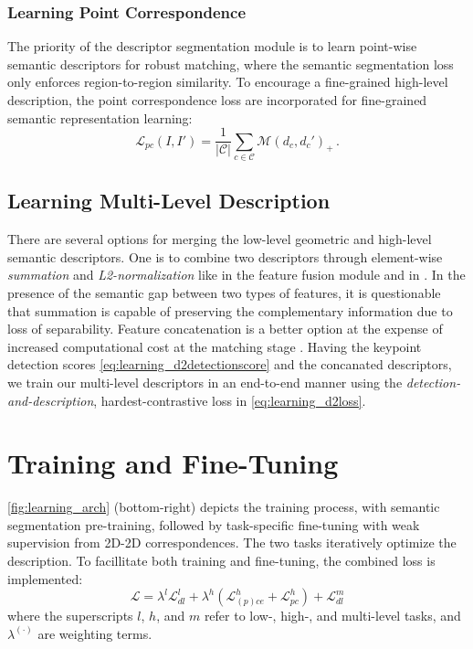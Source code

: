 \subsubsection{Learning Point Correspondence}
The priority of the descriptor segmentation module is to learn point-wise semantic descriptors for robust matching, where the semantic segmentation loss only enforces region-to-region similarity. To encourage a fine-grained high-level description, the point correspondence loss are incorporated for fine-grained semantic representation learning:
\begin{equation} \label{eq:learning_pc}
\mathcal{L}_{pc}(I,I') = \frac{1}{|\mathcal{C}|} \sum_{c \in
\mathcal{C}} \mathcal{M}(d_c,d_c')_+ \,.
\end{equation}

\subsection{Learning Multi-Level Description}
There are several options for merging the low-level geometric and high-level semantic descriptors. 
One is to combine two descriptors through element-wise \textit{summation} and \textit{L2-normalization} like in the feature
fusion module and in \cite{luo2019contextdesc}.
In the presence of the semantic gap between two types of features, it is questionable that summation is capable of preserving the complementary information due to loss of separability.
Feature concatenation is a better option at the expense of increased computational cost at the matching stage
\cite{hariharan2015hypercolumns, fathy2018hierarchical,
spencer2019scale, germain2019sparse, min2019hyperpixel}. 
Having the keypoint detection scores \eqref{eq:learning_d2detectionscore} and the concanated descriptors, we train our multi-level descriptors in an
end-to-end manner using the {\em detection-and-description}, hardest-contrastive loss in \eqref{eq:learning_d2loss}.

\section{Training and Fine-Tuning}

\ref{fig:learning_arch} (bottom-right) depicts the training process, with semantic segmentation pre-training, followed by task-specific fine-tuning with weak supervision from 2D-2D correspondences. 
The two tasks iteratively optimize the description.
To facillitate both training and fine-tuning, the combined loss is implemented:
\begin{equation} \label{eq:learning_trainingloss}
\mathcal{L} = \lambda^{l}\mathcal{L}^{l}_{dl} + \lambda^{h}(\mathcal{L}^{h}_{(p)ce} + \mathcal{L}^{h}_{pc}) + \mathcal{L}^{m}_{dl}
\end{equation}
where the superscripts $l$, $h$, and $m$ refer to low-, high-, and multi-level tasks, and $\lambda^{(\cdot)}$ are weighting terms. 

